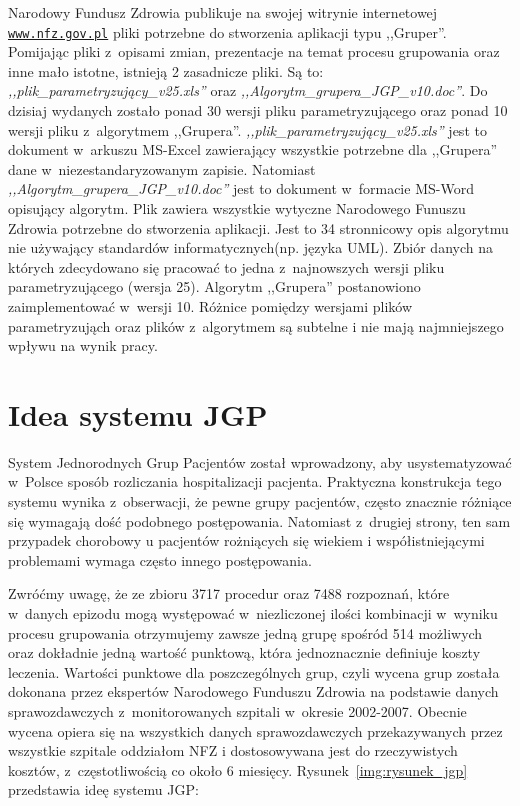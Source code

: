Narodowy Fundusz Zdrowia publikuje na swojej witrynie internetowej \underline{\texttt{www.nfz.gov.pl}} pliki potrzebne do stworzenia aplikacji typu ,,Gruper''. Pomijając pliki z~opisami zmian, prezentacje na temat procesu grupowania oraz inne mało istotne, istnieją 2 zasadnicze pliki. Są to: \textsl{,,plik\_parametryzujący\_v25.xls''}\cite{plik_parametryzujacy} oraz \textsl{,,Algorytm\_grupera\_JGP\_v10.doc''}\cite{algorytm_grupera}. Do dzisiaj wydanych zostało ponad 30 wersji pliku parametryzującego oraz ponad 10 wersji pliku z~algorytmem ,,Grupera''.
\textsl{,,plik\_parametryzujący\_v25.xls''} jest to dokument w~arkuszu MS-Excel zawierający wszystkie potrzebne dla ,,Grupera'' dane w~niezestandaryzowanym zapisie. Natomiast \textsl{,,Algorytm\_grupera\_JGP\_v10.doc''} jest to dokument w~formacie MS-Word opisujący algorytm. Plik zawiera wszystkie wytyczne Narodowego Funuszu Zdrowia potrzebne do stworzenia aplikacji. Jest to 34 stronnicowy opis algorytmu nie używający standardów informatycznych(np. języka UML). Zbiór danych na których zdecydowano się pracować to jedna z~najnowszych wersji pliku parametryzującego (wersja 25). Algorytm ,,Grupera'' postanowiono zaimplementować w~wersji 10. Różnice pomiędzy wersjami plików parametryzująch oraz plików z~algorytmem są subtelne i nie mają najmniejszego wpływu na wynik pracy.


\section{Idea systemu JGP}
\label{sec:ideaSystemuJGP}

System Jednorodnych Grup Pacjentów został wprowadzony, aby usystematyzować w~Polsce sposób rozliczania hospitalizacji pacjenta. Praktyczna konstrukcja tego systemu wynika z~obserwacji, że pewne grupy pacjentów, często znacznie różniące się wymagają dość podobnego postępowania. Natomiast z~drugiej strony, ten sam przypadek chorobowy u pacjentów rożniących się wiekiem i współistniejącymi problemami wymaga często innego postępowania\cite{kozierkiewicz_jgp}.

Zwróćmy uwagę, że ze zbioru 3717 procedur oraz 7488 rozpoznań, które w~danych epizodu mogą występować w~niezliczonej ilości kombinacji w~wyniku procesu grupowania otrzymujemy zawsze jedną grupę spośród 514 możliwych oraz dokładnie jedną wartość punktową, która jednoznacznie definiuje koszty leczenia.
Wartości punktowe dla poszczególnych grup, czyli wycena grup została dokonana przez ekspertów Narodowego Funduszu Zdrowia na podstawie danych sprawozdawczych z~monitorowanych szpitali w~okresie 2002-2007. Obecnie wycena opiera się na wszystkich danych sprawozdawczych przekazywanych przez wszystkie szpitale oddziałom NFZ i dostosowywana jest do rzeczywistych kosztów, z~częstotliwością co około 6 miesięcy\cite{szkoleniaJGP}.
Rysunek~\ref{img:rysunek_jgp} przedstawia ideę systemu JGP:

